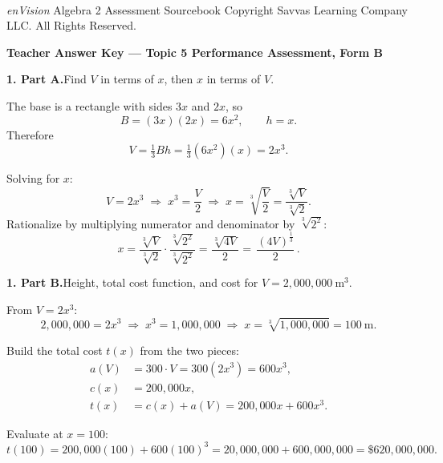 \documentclass[11pt]{article}
\begin{document}
\vfill
\begin{center}\footnotesize
\textit{enVision}\textsuperscript{\textregistered} Algebra 2 \quad\textbullet\quad
Assessment Sourcebook \quad\textbullet\quad
Copyright \textcopyright{} Savvas Learning Company LLC. All Rights Reserved.
\end{center}

\newpage
\begin{center}
{\Large\textbf{Teacher Answer Key --- Topic 5 Performance Assessment, Form B}}
\end{center}

\vspace{0.8em}

\textbf{1. Part A.}\quad Find $V$ in terms of $x$, then $x$ in terms of $V$.

The base is a rectangle with sides $3x$ and $2x$, so
\[
B = (3x)(2x) = 6x^2, \qquad h = x.
\]
Therefore
\[
V = \tfrac{1}{3}Bh = \tfrac{1}{3}(6x^2)(x) = 2x^3.
\]

Solving for $x$:
\[
V = 2x^3 \;\Longrightarrow\; x^3 = \frac{V}{2}
\;\Longrightarrow\; x = \sqrt[3]{\frac{V}{2}}
= \frac{\sqrt[3]{V}}{\sqrt[3]{2}}.
\]
Rationalize by multiplying numerator and denominator by $\sqrt[3]{2^2}$:
\[
x = \frac{\sqrt[3]{V}}{\sqrt[3]{2}}\cdot\frac{\sqrt[3]{2^2}}{\sqrt[3]{2^2}}
= \frac{\sqrt[3]{4V}}{2}
= \boxed{\,\frac{(4V)^{\tfrac{1}{3}}}{2}\,}.
\]

\vspace{0.4em}
\textbf{1. Part B.}\quad Height, total cost function, and cost for $V=2{,}000{,}000\ \text{m}^3$.

From $V = 2x^3$:
\[
2{,}000{,}000 = 2x^3 \;\Longrightarrow\; x^3 = 1{,}000{,}000
\;\Longrightarrow\; x = \sqrt[3]{1{,}000{,}000} = 100\ \text{m}.
\]

Build the total cost $t(x)$ from the two pieces:
\begin{align*}
a(V) &= 300\cdot V = 300(2x^3) = 600x^3, \\
c(x) &= 200{,}000x, \\
t(x) &= c(x) + a(V) = 200{,}000x + 600x^3.
\end{align*}

Evaluate at $x = 100$:
\[
t(100) = 200{,}000(100) + 600(100)^3
       = 20{,}000{,}000 + 600{,}000{,}000
       = \boxed{\$620{,}000{,}000}.
\]

\vspace{1.2em}
\end{document}
